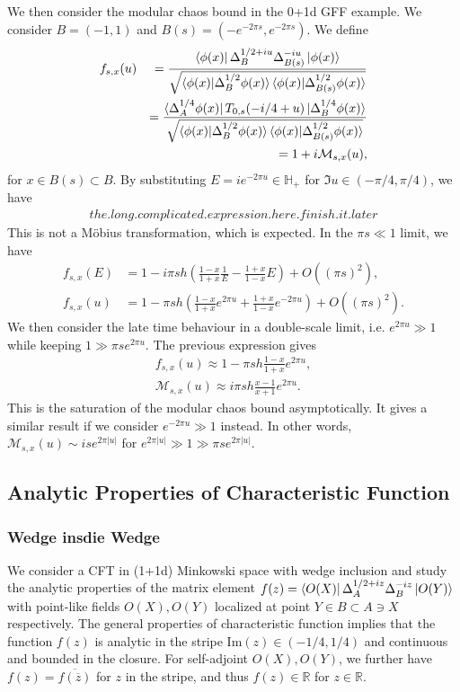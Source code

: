 \documentclass[a4paper,11pt]{article}
\theoremstyle{definition}
\newcommand{\nn}{\nonumber}
\newcommand{\lb}{\left(}
\newcommand{\rb}{\right)}
\newcommand{\mM}{\mathcal{M}}
\begin{document}
We then consider the modular chaos bound in the 0+1d GFF example. We consider $B = (-1,1)$ and $B(s) = (-e^{-2\pi s}, e^{-2\pi s})$. We define
\begin{eqnarray}
    f_{s,x}(u)&&=\frac{\bra{\phi(x)}\Delta_B^{1/2+iu}\Delta_{B(s)}^{-iu}\ket{\phi(x)}}{\sqrt{\braket{\phi(x)|\Delta_B^{1/2}\phi(x)}\braket{\phi(x)|\Delta_{B(s)}^{1/2}\phi(x)}}}\\
    &&=\frac{\bra{\Delta_A^{1/4}\phi(x)} T_{0,s}(-i/4+u)\ket{\Delta_B^{1/4} \phi(x)}}{\sqrt{\braket{\phi(x)|\Delta_B^{1/2}\phi(x)}\braket{\phi(x)|\Delta_{B(s)}^{1/2}\phi(x)}}}\nn\\
    &&=1+i \mathcal{M}_{s,x}(u),
\end{eqnarray}
for $x \in B(s)\subset B$. By substituting $E = ie^{-2\pi u} \in {\mathbb{H}_+}$ for $\Im u \in (-\pi/4,\pi/4)$, we have
\begin{align}
    the.long.complicated.expression.here.finish.it.later
\end{align}
This is not a M\"obius transformation, which is expected. In the $\pi s \ll 1$ limit, we have
\begin{align}
    f_{s,x}(E) &= 1 - i\pi s h\lb \frac{1-x}{1+x}\frac{1}{E} - \frac{1+x}{1-x}E \rb + O((\pi s)^2),\\
    f_{s,x}(u) &= 1 - \pi s h\lb \frac{1-x}{1+x}e^{2\pi u} + \frac{1+x}{1-x}e^{-2\pi u} \rb + O((\pi s)^2).
\end{align}
We then consider the late time behaviour in a double-scale limit, i.e. $e^{2\pi u} \gg1$ while keeping $1\gg\pi se^{2\pi u}$. The previous expression gives
\begin{align} 
    f_{s,x}(u) \approx 1 - \pi s h \frac{1-x}{1+x}e^{2\pi u},\\
    \mM_{s,x}(u)\approx i\pi s h \frac{x-1}{x+1}e^{2\pi u}.
\end{align}
This is the saturation of the modular chaos bound asymptotically. It gives a similar result if we consider $e^{-2\pi u} \gg1$ instead. In other words, $\mM_{s,x}(u) \sim ise^{2\pi |u|}$ for $e^{2\pi |u|} \gg 1\gg\pi se^{2\pi |u|}$.


\subsection{Analytic Properties of Characteristic Function}
\subsubsection{Wedge insdie Wedge}
We consider a CFT in (1+1d) Minkowski space with wedge inclusion and study the analytic properties of the matrix element $f(z)=\bra{O(X)}\Delta_A^{1/2+iz}\Delta_B^{-iz}\ket{O(Y)}$ with point-like fields $O(X), O(Y)$ localized at point $Y\in B \subset A\ni X$ respectively. The general properties of characteristic function implies that the function $f(z)$ is analytic in the stripe Im$(z)\in (-1/4,1/4)$ and continuous and bounded in the closure. For self-adjoint $O(X), O(Y)$, we further have $f(z) = \overline{f(\overline{z})}$ for $z$ in the stripe, and thus $f(z)\in\mathbb{R}$ for $z\in\mathbb{R}$.
\end{document}
